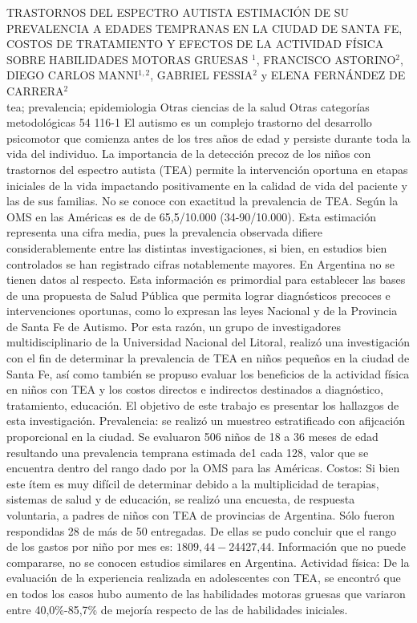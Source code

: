 \A
{TRASTORNOS DEL ESPECTRO AUTISTA ESTIMACIÓN DE SU PREVALENCIA A EDADES TEMPRANAS EN LA CIUDAD DE SANTA FE, COSTOS DE TRATAMIENTO Y EFECTOS DE LA ACTIVIDAD FÍSICA SOBRE HABILIDADES MOTORAS GRUESAS}
{$^1$, FRANCISCO ASTORINO$^2$, DIEGO CARLOS MANNI$^{1,2}$, GABRIEL FESSIA$^2$ y ELENA FERNÁNDEZ DE CARRERA$^2$}
{
\\}
{tea; prevalencia; epidemiologia} 
 {Otras ciencias de la salud} 
 {Otras categorías metodológicas} 
 {54} 
 {116-1}
{El autismo es un complejo trastorno del desarrollo psicomotor que comienza antes de los tres años de edad y persiste durante toda la vida del individuo. La importancia de la detección precoz de los niños con trastornos del espectro autista (TEA) permite la intervención oportuna en etapas iniciales de la vida impactando positivamente en la calidad de vida del paciente y las de sus familias. No se conoce con exactitud la prevalencia de TEA. Según la OMS en las Américas es de de 65,5/10.000 (34-90/10.000). Esta estimación representa una cifra media, pues la prevalencia observada difiere considerablemente entre las distintas investigaciones, si bien, en estudios bien controlados se han registrado cifras notablemente mayores. En Argentina no se tienen datos al respecto. Esta información es primordial para establecer las bases de una propuesta de Salud Pública que permita lograr diagnósticos precoces e intervenciones oportunas, como lo expresan las leyes Nacional y de la Provincia de Santa Fe de Autismo. Por esta razón, un grupo de investigadores multidisciplinario de la Universidad Nacional del Litoral, realizó una investigación con el fin de determinar la prevalencia de TEA en niños pequeños en la ciudad de Santa Fe, así como también se propuso evaluar los beneficios de la actividad física en niños con TEA y los costos directos e indirectos destinados a diagnóstico, tratamiento, educación. El objetivo de este trabajo es presentar los hallazgos de esta investigación. Prevalencia: se realizó un muestreo estratificado con afijcación proporcional en la ciudad. Se evaluaron 506 niños de 18 a 36 meses de edad resultando una prevalencia temprana estimada de1 cada 128, valor que se encuentra dentro del rango dado por la OMS para las Américas. Costos: Si bien este ítem es muy difícil de determinar debido a la multiplicidad de terapias, sistemas de salud y de educación, se realizó una encuesta, de respuesta voluntaria, a padres de niños con TEA de provincias de Argentina. Sólo fueron respondidas 28 de más de 50 entregadas. De ellas se pudo concluir que el rango de los gastos por niño por mes es: $1809,44 - $24427,44. Información que no puede compararse, no se conocen estudios similares en Argentina. Actividad física: De la evaluación de la experiencia realizada en adolescentes con TEA, se encontró que en todos los casos hubo aumento de las habilidades motoras gruesas que variaron entre 40,0\%-85,7\% de mejoría respecto de las de habilidades iniciales. }
